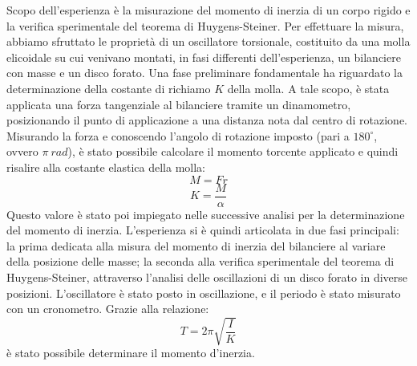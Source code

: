Scopo dell'esperienza è la misurazione del momento di inerzia di un corpo rigido e la verifica sperimentale del teorema di Huygens-Steiner. Per effettuare la misura, abbiamo sfruttato le proprietà di un oscillatore torsionale, costituito da una molla elicoidale su cui venivano montati, in fasi differenti dell'esperienza, un bilanciere con masse e un disco forato. Una fase preliminare fondamentale ha riguardato la determinazione della costante di richiamo $K$ della molla. A tale scopo, è stata applicata una forza tangenziale al bilanciere tramite un dinamometro, posizionando il punto di applicazione a una distanza nota dal centro di rotazione. Misurando la forza e conoscendo l'angolo di rotazione imposto (pari a $180^{\circ}$, ovvero $\pi \ rad$), è stato possibile calcolare il momento torcente applicato e quindi risalire alla costante elastica della molla:
\begin{equation}
	M = Fr
\end{equation}
\begin{equation}
	K=\frac{M}{\alpha}
\end{equation}
Questo valore è stato poi impiegato nelle successive analisi per la determinazione del momento di inerzia. L'esperienza si è quindi articolata in due fasi principali: la prima dedicata alla misura del momento di inerzia del bilanciere al variare della posizione delle masse; la seconda alla verifica sperimentale del teorema di Huygens-Steiner, attraverso l'analisi delle oscillazioni di un disco forato in diverse posizioni. L'oscillatore è stato posto in oscillazione, e il periodo è stato misurato con un cronometro. Grazie alla relazione:
\begin{equation}
	T=2\pi\sqrt{\frac{I}{K}}
\end{equation}
è stato possibile determinare il momento d'inerzia.